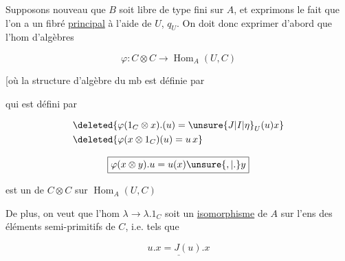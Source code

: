 

Supposons   nouveau que $B$ soit libre de type fini sur $A$,  et exprimons le fait que  l'on a un fibré \uline{principal}  à l'aide de $U$, $q_U$. On doit donc exprimer d'abord que l'hom d'algèbres

\[
\varphi:C\otimes C\longrightarrow\operatorname{Hom}_A(U,C)
\]

[où la structure d'algèbre du  mb est définie par

\diagram{\begin{tikzcd}[ampersand replacement=\&]
U\arrow[r,"{\unsure{\Delta_U|\check{\Delta}_U}}"]\arrow[rrr,bend right=15,"{v*w}"'] \& U\otimes U\arrow[r,"{v\otimes w}"]\& C\otimes C\arrow[r,"{\Delta_C}"]\& C\quad{]}
\end{tikzcd}}

qui est défini par

\[
\begin{aligned}
&\deleted{\varphi(1_C\otimes x).(u)=\unsure{J|I|\eta}_U(u)x}\\
&\deleted{\varphi(x\otimes1_C)(u)=u\,x}
\end{aligned}
\]

\[
\boxed{\varphi(x\otimes y).u=u(x)\unsure{,|.}y}
\]

\makebox[0pt][r]{\smash{\raisebox{-2.3\baselineskip}{\(\left.\vphantom{\rule{0pt}{5\baselineskip}}\right]\)}}\hspace{.65em}}est un  de $C\otimes C$ sur $\operatorname{Hom}_A(U,C)$

De plus, on veut que l'hom $\lambda\to\lambda.1_C$ soit un \uline{isomorphisme} de $A$ sur l'ens des éléments semi-primitifs de $C$, i.e. tels que

\[
\underline{u.x=J(u).x}
\]
